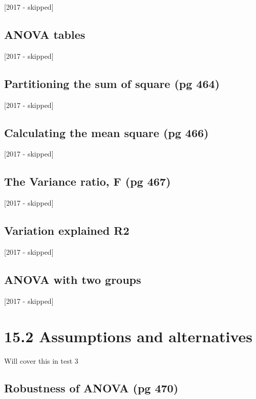 \documentclass[]{book}
\theoremstyle{definition}
\theoremstyle{definition}
\theoremstyle{definition}
\theoremstyle{remark}
\begin{document}
{[}2017 - skipped{]}

\subsection{ANOVA tables}\label{anova-tables}

{[}2017 - skipped{]}

\subsection{Partitioning the sum of square (pg
464)}\label{partitioning-the-sum-of-square-pg-464}

{[}2017 - skipped{]}

\subsection{Calculating the mean square (pg
466)}\label{calculating-the-mean-square-pg-466}

{[}2017 - skipped{]}

\subsection{The Variance ratio, F (pg
467)}\label{the-variance-ratio-f-pg-467}

{[}2017 - skipped{]}

\subsection{Variation explained R2}\label{variation-explained-r2}

{[}2017 - skipped{]}

\subsection{ANOVA with two groups}\label{anova-with-two-groups}

{[}2017 - skipped{]}

\section{15.2 Assumptions and
alternatives}\label{assumptions-and-alternatives}

Will cover this in test 3

\subsection{Robustness of ANOVA (pg
470)}\label{robustness-of-anova-pg-470}
\end{document}
